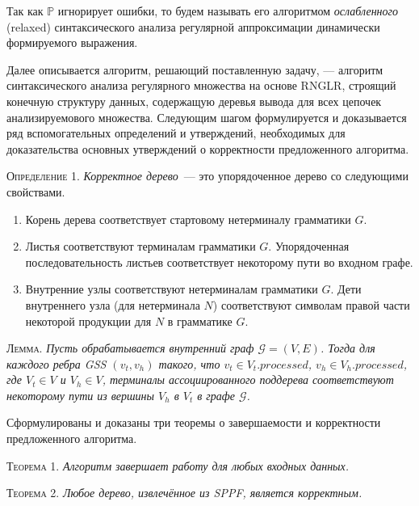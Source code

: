 Так как $\mathbb{P}$ игнорирует ошибки, то будем называть его алгоритмом \textit{ослабленного} (relaxed) синтаксического анализа регулярной аппроксимации динамически формируемого выражения.

Далее описывается алгоритм, решающий поставленную задачу, --- алгоритм синтаксического анализа регулярного множества на основе RNGLR, строящий конечную структуру данных, содержащую деревья вывода для 
всех цепочек анализируемового множества. Следующим шагом формулируется и доказывается ряд вспомогательных определений и утверждений, необходимых для доказательства основных утверждений о корректности предложенного алгоритма.

\textsc{Определение 1.} 
\emph{Корректное дерево}~--- это упорядоченное дерево со следующими свойствами.
\begin{enumerate}
  \item Корень дерева соответствует стартовому нетерминалу грамматики $G$.
  \item Листья соответствуют терминалам грамматики $G$. Упорядоченная последовательность листьев соответствует некоторому пути во входном графе.
  \item Внутренние узлы соответствуют нетерминалам грамматики $G$. Дети внутреннего узла (для нетерминала $N$) соответствуют символам правой части некоторой продукции для $N$ в грамматике $G$.
\end{enumerate}

\textsc{Лемма.}
\textit{Пусть обрабатывается внутренний граф $\mathcal{G}=(V,E)$. Тогда для каждого ребра GSS $(v_{t}, v_{h})$ такого, что $v_{t} \in V_{t}.processed$, $v_{h} \in V_{h}.processed$, где $V_{t} \in V$ и $V_{h} \in V$, терминалы ассоциированного поддерева соответствуют некоторому пути из вершины $V_{h}$ в $V_{t}$ в графе $\mathcal{G}$.}

\vspace{10pt}

Сформулированы и доказаны три теоремы о завершаемости и корректности предложенного алгоритма.

\vspace{5pt}

\textsc{Теорема 1.} 
\textit{Алгоритм завершает работу для любых входных данных.}

\vspace{10pt}

\textsc{Теорема 2.} 
\textit{Любое дерево, извлечённое из SPPF, является корректным.}

\vspace{10pt}

